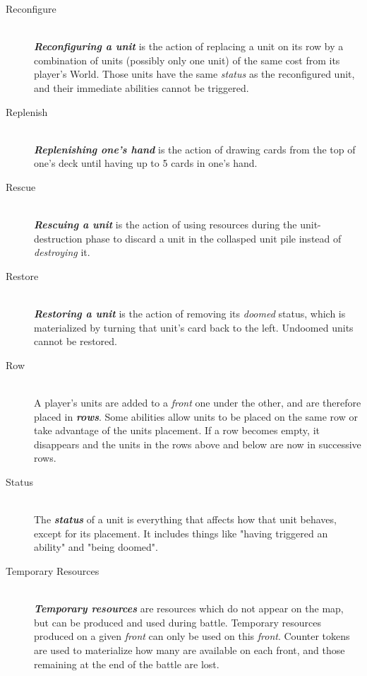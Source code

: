 \documentclass[a4paper]{article}
\begin{document}
\begin{description}
        \item[Reconfigure] \hfill \\
            \textbf{\textit{Reconfiguring a unit}} is the action of replacing a unit
            on its row by a combination of units (possibly only one unit)
            of the same cost from its player's World.
            Those units have the same \textit{status} as the reconfigured unit,
            and their immediate abilities cannot be triggered.
            
        \item[Replenish] \hfill \\
            \textbf{\textit{Replenishing one's hand}} is the action of drawing
            cards from the top of one's deck until having up to 5 cards in one's hand.
            
        \item[Rescue] \hfill \\
            \textbf{\textit{Rescuing a unit}} is the action of using resources
            during the unit-destruction phase to discard a unit in the collasped unit
            pile instead of \textit{destroying} it.
            
        \item[Restore] \hfill \\
            \textbf{\textit{Restoring a unit}} is the action of removing
            its \textit{doomed} status, which is materialized by turning
            that unit's card back to the left.
            Undoomed units cannot be restored.
            
        \item[Row] \hfill \\
            A player's units are added to a \textit{front} one under the other,
            and are therefore placed in \textbf{\textit{rows}}.
            Some abilities allow units to be placed on the same row or
            take advantage of the units placement.
            If a row becomes empty, it disappears and the units in the rows
            above and below are now in successive rows.
            
        \item[Status] \hfill \\
            The \textbf{\textit{status}} of a unit is everything that affects how
            that unit behaves, except for its placement.
            It includes things like "having triggered an ability" and "being doomed".
            
        \item[Temporary Resources] \hfill \\
            \textbf{\textit{Temporary resources}} are resources which do not appear
            on the map, but can be produced and used during battle.
            Temporary resources produced on a given \textit{front} can only be
            used on this \textit{front}.
            Counter tokens are used to materialize how many are available on each front,
            and those remaining at the end of the battle are lost.
            

\end{description}
\end{document}
